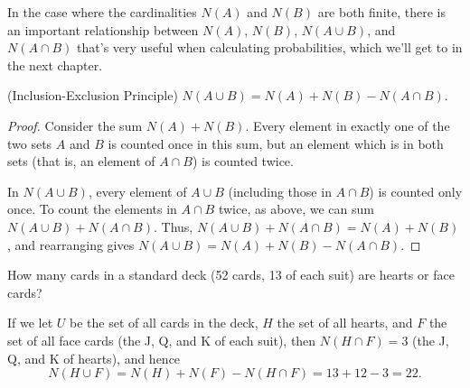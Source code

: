 In the case where the cardinalities $N(A)$ and $N(B)$ are both finite, there is an important relationship between $N(A)$, $N(B)$, $N(A \cup B)$, and $N(A \cap B)$ that's very useful when calculating probabilities, which we'll get to in the next chapter.

\begin{theorem}
(Inclusion-Exclusion Principle) $N(A \cup B) = N(A) + N(B) - N(A \cap B)$.
\end{theorem}
\begin{proof} Consider the sum $N(A) + N(B)$. Every element in exactly one of the two sets $A$ and $B$ is counted once in this sum, but an element which is in both sets (that is, an element of $A \cap B$) is counted twice.

\begin{center}
\end{center}

In $N(A \cup B)$, every element of $A \cup B$ (including those in $A \cap B$) is counted only once. To count the elements in $A \cap B$ twice, as above, we can sum $N(A \cup B) + N(A \cap B)$. Thus, $N(A \cup B) + N(A \cap B) = N(A) + N(B)$, and rearranging gives $N(A \cup B) = N(A) + N(B) - N(A \cap B)$.

\end{proof}

\begin{example}
How many cards in a standard deck (52 cards, 13 of each suit) are hearts or face cards?

If we let $U$ be the set of all cards in the deck, $H$ the set of all hearts, and $F$ the set of all face cards (the J, Q, and K of each suit), then $N(H \cap F) = 3$ (the J, Q, and K of hearts), and hence
$$N(H \cup F) = N(H) + N(F) - N(H \cap F) = 13 + 12 - 3 = 22.$$
\end{example}

